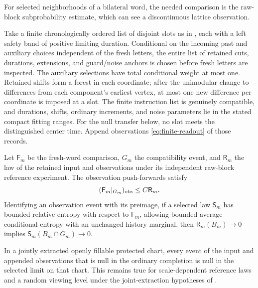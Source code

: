 For selected neighborhoods of a bilateral word, the needed comparison
is the raw-block subprobability estimate, which can see a discontinuous
lattice observation.

\begin{lemma}
\label{lem:record-null-transfer}
Take a finite chronologically ordered list of disjoint slots as in
\cite[Proposition~7.16]{P}, each with a left safety band of positive
limiting duration.  Conditional on the incoming past and auxiliary
choices independent of the fresh letters, the entire list of retained
cuts, durations, extensions, and guard/noise anchors is chosen before
fresh letters are inspected.  The auxiliary selections have total
conditional weight at most one.  Retained shifts form a forest in each
coordinate; after the unimodular change to differences from each
component's earliest vertex, at most one new difference per coordinate
is imposed at a slot.  The finite instruction list is genuinely
compatible, and durations, shifts, ordinary increments, and noise
parameters lie in the stated compact fitting ranges.  For the null
transfer below, no slot meets the distinguished center time.  Append observations
\eqref{eq:finite-readout} of those records.

Let \(\mathsf F_m\) be the fresh-word comparison, \(G_m\) the
compatibility event, and \(\mathsf R_m\) the law of the retained input
and observations under its independent raw-block reference experiment.
The observation push-forwards satisfy
\begin{equation}
 (\mathsf F_m|_{G_m})_{\rm obs}\le C\mathsf R_m.
 \label{eq:record-domination}
\end{equation}
Identifying an observation event with its preimage, if a selected law
\(\mathsf S_m\) has bounded relative entropy with
respect to \(\mathsf F_m\), allowing bounded average conditional
entropy with an unchanged history marginal, then
\(\mathsf R_m(B_m)\to0\) implies
\(\mathsf S_m(B_m\cap G_m)\to0\).

In a jointly extracted openly fillable protected chart, every event of
the input and appended observations that is null in the ordinary
completion is null in the selected limit on that chart.  This remains
true for scale-dependent reference laws and a random viewing level
under the joint-extraction hypotheses of
\cite[Proposition~7.18]{P}.
\end{lemma}

